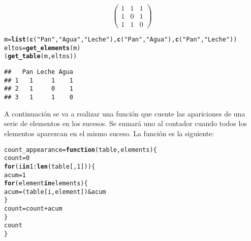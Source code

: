 \documentclass[12pt]{report}\usepackage[]{graphicx}\usepackage[dvipsnames]{xcolor}
\makeatletter
\newcommand{\hlnum}[1]{\textcolor[rgb]{0.686,0.059,0.569}{#1}}%
\newcommand{\hlstr}[1]{\textcolor[rgb]{0.192,0.494,0.8}{#1}}%
\newcommand{\hlopt}[1]{\textcolor[rgb]{0,0,0}{#1}}%
\newcommand{\hlstd}[1]{\textcolor[rgb]{0.345,0.345,0.345}{#1}}%
\newcommand{\hlkwa}[1]{\textcolor[rgb]{0.161,0.373,0.58}{\textbf{#1}}}%
\newcommand{\hlkwb}[1]{\textcolor[rgb]{0.69,0.353,0.396}{#1}}%
\newcommand{\hlkwc}[1]{\textcolor[rgb]{0.333,0.667,0.333}{#1}}%
\newcommand{\hlkwd}[1]{\textcolor[rgb]{0.737,0.353,0.396}{\textbf{#1}}}%
\newenvironment{kframe}{%
 \def\at@end@of@kframe{}%
 \ifinner\ifhmode%
  \def\at@end@of@kframe{\end{minipage}}%
  \begin{minipage}{\columnwidth}%
 \fi\fi%
 \def\FrameCommand##1{\hskip\@totalleftmargin \hskip-\fboxsep
 \colorbox{shadecolor}{##1}\hskip-\fboxsep
     \hskip-\linewidth \hskip-\@totalleftmargin \hskip\columnwidth}%
 \MakeFramed {\advance\hsize-\width
   \@totalleftmargin\z@ \linewidth\hsize
   \@setminipage}}%
 {\par\unskip\endMakeFramed%
 \at@end@of@kframe}
\newenvironment{knitrout}{}{} %
\makeatother
\begin{document}
			$$
			\begin{pmatrix}
				1 & 1 & 1\\
				1 & 0 & 1\\
				1 & 1 & 0
			\end{pmatrix}
			$$
			
\begin{knitrout}
\color{fgcolor}\begin{kframe}
\begin{alltt}
\hlstd{m} \hlkwb{=} \hlkwd{list}\hlstd{(}\hlkwd{c}\hlstd{(}\hlstr{"Pan"}\hlstd{,} \hlstr{"Agua"}\hlstd{,} \hlstr{"Leche"}\hlstd{),} \hlkwd{c}\hlstd{(}\hlstr{"Pan"}\hlstd{,} \hlstr{"Agua"}\hlstd{),} \hlkwd{c}\hlstd{(}\hlstr{"Pan"}\hlstd{,} \hlstr{"Leche"}\hlstd{))}
\hlstd{eltos} \hlkwb{=} \hlkwd{get_elements}\hlstd{(m)}
\hlstd{(}\hlkwd{get_table}\hlstd{(m, eltos))}
\end{alltt}
\begin{verbatim}
##   Pan Leche Agua
## 1   1     1    1
## 2   1     0    1
## 3   1     1    0
\end{verbatim}
\end{kframe}
\end{knitrout}
			
			A continuación se va a realizar una función que cuente las apariciones de una serie de elementos en los sucesos. Se sumará uno al contador cuando todos los elementos aparezcan en el mismo suceso. La función es la siguiente:
			
\begin{knitrout}
\color{fgcolor}\begin{kframe}
\begin{alltt}
\hlstd{count_appearance} \hlkwb{=} \hlkwa{function}\hlstd{(}\hlkwc{table}\hlstd{,} \hlkwc{elements}\hlstd{) \{}
        \hlstd{count} \hlkwb{=} \hlnum{0}
        \hlkwa{for} \hlstd{(i} \hlkwa{in} \hlnum{1}\hlopt{:}\hlkwd{len}\hlstd{(table[,}\hlnum{1}\hlstd{])) \{}
                \hlstd{acum} \hlkwb{=} \hlnum{1}
                \hlkwa{for} \hlstd{(element} \hlkwa{in} \hlstd{elements) \{}
                        \hlstd{acum} \hlkwb{=} \hlstd{(table[i,element])} \hlopt{&} \hlstd{acum}
                \hlstd{\}}
                \hlstd{count} \hlkwb{=} \hlstd{count} \hlopt{+} \hlstd{acum}
        \hlstd{\}}
        \hlstd{count}
\hlstd{\}}
\end{alltt}
\end{kframe}
\end{knitrout}
			
\end{document}
